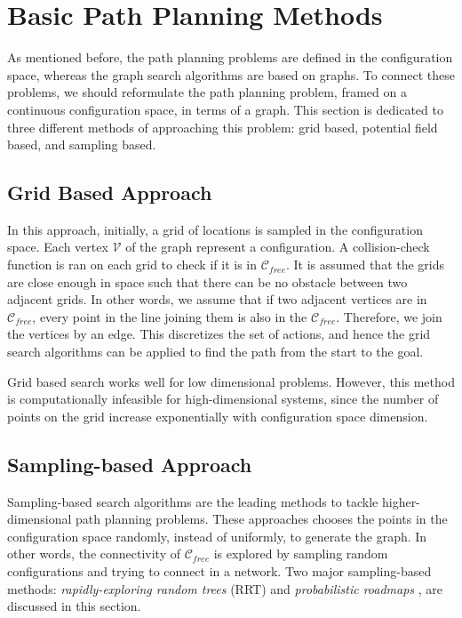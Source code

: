 \section{Basic Path Planning Methods}
\label{sec:basic_motion_planning}
As mentioned before, the path planning problems are defined in the configuration space, whereas the graph search algorithms are based on graphs. To connect these problems, we should reformulate the path planning problem, framed on a continuous configuration space, in terms of a graph. This section is dedicated to three different methods of approaching this problem: grid based, potential field based, and sampling based.
\subsection{Grid Based Approach}
\label{sec:grid_search}
In this approach, initially, a grid of locations is sampled in the configuration space. Each vertex $\mathcal{V}$ of the graph represent a configuration. A collision-check function is ran on each grid to check if it is in $\mathcal{C}_{free}$. It is assumed that the grids are close enough in space such that there can be no obstacle between two adjacent grids. In other words, we assume that if two adjacent vertices are in $\mathcal{C}_{free}$, every point in the line joining them is also in the $\mathcal{C}_{free}$. Therefore, we join the vertices by an edge. This discretizes the set of actions, and hence the grid search algorithms can be applied to find the path from the start to the goal. 

Grid based search works well for low dimensional problems. However, this method is computationally infeasible for high-dimensional systems, since the number of points on the grid increase exponentially with configuration space dimension. 

\subsection{Sampling-based Approach}
\label{sec:sampling_search}
Sampling-based search algorithms are the leading methods to tackle higher-dimensional path planning problems. These approaches chooses the points in the configuration space randomly, instead of uniformly, to generate the graph. In other words, the connectivity of $\mathcal{C}_{free}$ is explored by sampling random configurations and trying to connect in a network. Two major sampling-based methods: \textit{rapidly-exploring random trees} (RRT) \cite{lavalle2006planning} and \textit{probabilistic roadmaps} \cite{kavraki1994probabilistic}, are discussed in this section.

